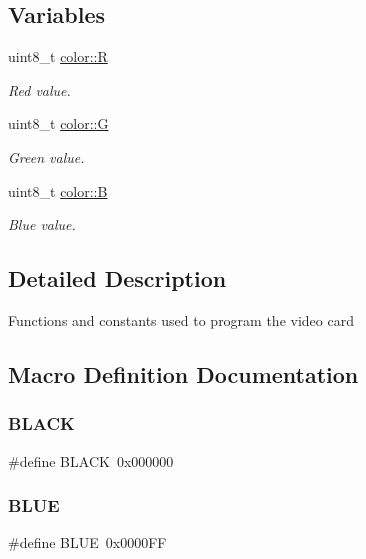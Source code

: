 \subsection*{Variables}
\begin{DoxyCompactItemize}
\item 
uint8\+\_\+t \mbox{\hyperlink{group__video_gacb56ae92e569346b946b93e1723bdcf0}{color\+::R}}
\begin{DoxyCompactList}\small\item\em Red value. \end{DoxyCompactList}\item 
uint8\+\_\+t \mbox{\hyperlink{group__video_ga4eca011840c222b0813c622714e7a2b5}{color\+::G}}
\begin{DoxyCompactList}\small\item\em Green value. \end{DoxyCompactList}\item 
uint8\+\_\+t \mbox{\hyperlink{group__video_gaf8420cf3aa35448f046467969f1f9775}{color\+::B}}
\begin{DoxyCompactList}\small\item\em Blue value. \end{DoxyCompactList}\end{DoxyCompactItemize}


\subsection{Detailed Description}
Functions and constants used to program the video card 

\subsection{Macro Definition Documentation}
\mbox{\label{group__video_ga7b3b25cba33b07c303f3060fe41887f6}} 
\subsubsection{\texorpdfstring{B\+L\+A\+CK}{BLACK}}
{\footnotesize\ttfamily \#define B\+L\+A\+CK~0x000000}

\mbox{\label{group__video_ga79d10e672abb49ad63eeaa8aaef57c38}} 
\subsubsection{\texorpdfstring{B\+L\+UE}{BLUE}}
{\footnotesize\ttfamily \#define B\+L\+UE~0x0000\+FF}

